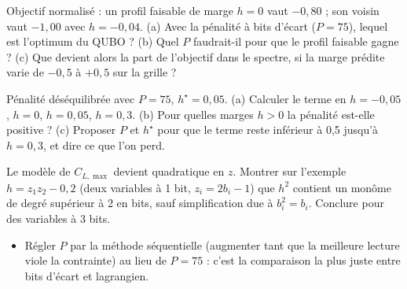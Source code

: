 \exercices
\begin{exercice}\label{ex:pen-rentable}
Objectif normalisé : un profil faisable de marge $h=0$ vaut $-0{,}80$ ; son voisin vaut $-1{,}00$ avec $h=-0{,}04$. (a) Avec la pénalité à bits d'écart ($P=75$), lequel est l'optimum du QUBO ? (b) Quel $P$ faudrait-il pour que le profil faisable gagne ? (c) Que devient alors la part de l'objectif dans le spectre, si la marge prédite varie de $-0{,}5$ à $+0{,}5$ sur la grille ?
\end{exercice}
\begin{exercice}\label{ex:pen-deseq}
Pénalité déséquilibrée avec $P=75$, $h^\star=0{,}05$. (a) Calculer le terme en $h=-0{,}05$, $h=0$, $h=0{,}05$, $h=0{,}3$. (b) Pour quelles marges $h>0$ la pénalité est-elle positive ? (c) Proposer $P$ et $h^\star$ pour que le terme reste inférieur à 0,5 jusqu'à $h=0{,}3$, et dire ce que l'on perd.
\end{exercice}
\begin{exercice}\label{ex:pen-degre}
Le modèle de $C_{L,\max}$ devient quadratique en $z$. Montrer sur l'exemple $h=z_1z_2-0{,}2$ (deux variables à 1 bit, $z_i=2b_i-1$) que $h^2$ contient un monôme de degré supérieur à 2 en bits, sauf simplification due à $b_i^2=b_i$. Conclure pour des variables à 3 bits.
\end{exercice}

\begin{pistes}
\begin{itemize}
\item Régler $P$ par la méthode séquentielle (augmenter tant que la meilleure lecture viole la contrainte) au lieu de $P=75$ : c'est la comparaison la plus juste entre bits d'écart et lagrangien.
\end{itemize}
\end{pistes}
